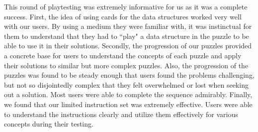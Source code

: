 This round of playtesting was extremely informative for us as it was a complete success. First, the idea of using cards for the data structures worked very well with our users. By using a medium they were familiar with, it was instinctual for them to understand that they had to ``play" a data structure in the puzzle to be able to use it in their solutions. Secondly, the progression of our puzzles provided a concrete base for users to understand the concepts of each puzzle and apply their solutions to similar but more complex puzzles. Also, the progression of the puzzles was found to be steady enough that users found the problems challenging, but not so disjointedly complex that they felt overwhelmed or lost when seeking out a solution. Most users were able to complete the sequence admirably. Finally, we found that our limited instruction set was extremely effective. Users were able to understand the instructions clearly and utilize them effectively for various concepts during their testing.\\